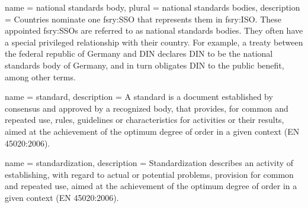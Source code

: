 


 { name = {national standards body}, plural =
  {national standards bodies}, description = {Countries nominate one
    \gls{fsry:SSO} that represents them in \gls{fsry:ISO}. These appointed
    \glspl{fsry:SSO} are referred to as national standards bodies. They
    often have a special privileged relationship with their
    country. For example, a treaty between the federal republic of
    Germany and DIN declares DIN to be the national standards body of
    Germany, and in turn obligates DIN to the public benefit, among
    other terms.}}

 { name = {standard},
  description = {A standard is a document established by consensus and
    approved by a recognized body, that provides, for common and
    repeated use, rules, guidelines or characteristics for activities
    or their results, aimed at the achievement of the optimum degree
    of order in a given context (EN 45020:2006).} }

 { name = {standardization},
  description = {Standardization describes an activity of
    establishing, with regard to actual or potential problems,
    provision for common and repeated use, aimed at the achievement of
    the optimum degree of order in a given context (EN 45020:2006).} }


